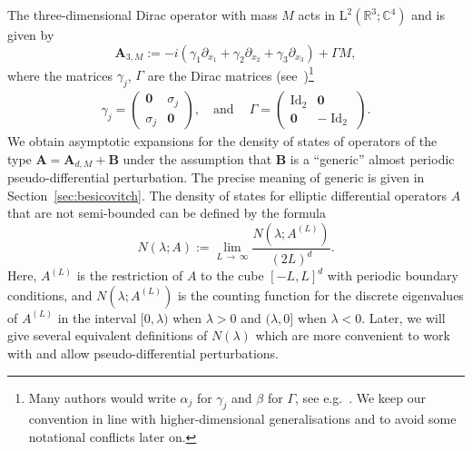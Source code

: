\documentclass[AHL,Unicode,longabstracts,published]{cedram}
\DeclareMathOperator{\Id}{Id}
\newcommand{\RL}{\mathrm{L}}
\newcommand{\R}{\mathbb R}
\newcommand{\C}{\mathbb C}
\newcommand{\BA}{\mathbf A}
\newcommand{\BB}{\mathbf B}
\newcommand{\del}{\partial}
\begin{document}
The three-dimensional Dirac operator with mass $M$ acts in $\RL^2(\R^3;\C^4)$ and is given by
\begin{equation}
\BA_{3,M} := -i \left(\gamma_1 \del_{x_1} + \gamma_2 \del_{x_2} + \gamma_3
\del_{x_3} \right) + \Gamma M,
\end{equation}
where the matrices $\gamma_j$, $\Gamma$ are the Dirac matrices (see~\cite{Upmeier})\footnote{Many authors would write $\alpha_j$ for $\gamma_j$ and $\beta$ for $\Gamma$, see e.g.~\cite{thaller}. We keep our convention in line with higher-dimensional generalisations and to avoid some notational conflicts later on.}
\begin{equation}
\begin{aligned}
\gamma_j=
\begin{pmatrix}
\mathbf 0 & \sigma_j\\
\sigma_j & \mathbf 0
\end{pmatrix}, \quad \text{and} \quad\
\Gamma=
\begin{pmatrix}
\Id_2 & \mathbf 0\\
\mathbf 0 & -\Id_2
\end{pmatrix}.
\end{aligned}
\end{equation}
We obtain asymptotic expansions for the density of states of operators of the type $\BA = \BA_{d,M} + \BB$ under the assumption that $\BB$ is a ``generic'' almost periodic pseudo-differential perturbation. The precise meaning of generic is given in Section~\ref{sec:besicovitch}. The density of states for elliptic differential operators $A$ that are not semi-bounded can be defined by the formula
\begin{equation}
N(\lambda;A) := \lim_{L\,\to\,\infty} \frac{N(\lambda;A^{(L)})}{(2L)^d}.
\end{equation}
Here, $A^{(L)}$ is the restriction of $A$ to the cube $[-L,L]^d$ with periodic boundary conditions, and $N(\lambda;A^{(L)})$ is the counting function for the discrete eigenvalues of $A^{(L)}$ in the interval $[0,\lambda)$ when $\lambda > 0$ and $(\lambda,0]$ when $\lambda < 0$. Later, we will give several equivalent definitions of $N(\lambda)$ which are more convenient to work with and allow pseudo-differential perturbations.
\end{document}
